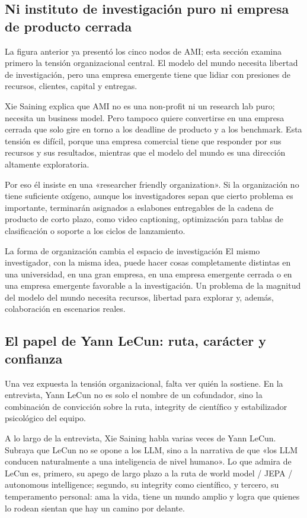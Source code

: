 \documentclass[a4paper]{article}
\begin{document}
\subsection{Ni instituto de investigación puro ni empresa de producto cerrada}

La figura anterior ya presentó los cinco nodos de AMI; esta sección examina primero la tensión organizacional central. El modelo del mundo necesita libertad de investigación, pero una empresa emergente tiene que lidiar con presiones de recursos, clientes, capital y entregas.

Xie Saining explica que AMI no es una non-profit ni un research lab puro; necesita un business model. Pero tampoco quiere convertirse en una empresa cerrada que solo gire en torno a los deadline de producto y a los benchmark. Esta tensión es difícil, porque una empresa comercial tiene que responder por sus recursos y sus resultados, mientras que el modelo del mundo es una dirección altamente exploratoria.

Por eso él insiste en una «researcher friendly organization». Si la organización no tiene suficiente oxígeno, aunque los investigadores sepan que cierto problema es importante, terminarán asignados a eslabones entregables de la cadena de producto de corto plazo, como video captioning, optimización para tablas de clasificación o soporte a los ciclos de lanzamiento.

\begin{importantbox}{La forma de organización cambia el espacio de investigación}
El mismo investigador, con la misma idea, puede hacer cosas completamente distintas en una universidad, en una gran empresa, en una empresa emergente cerrada o en una empresa emergente favorable a la investigación. Un problema de la magnitud del modelo del mundo necesita recursos, libertad para explorar y, además, colaboración en escenarios reales.
\end{importantbox}

\subsection{El papel de Yann LeCun: ruta, carácter y confianza}

Una vez expuesta la tensión organizacional, falta ver quién la sostiene. En la entrevista, Yann LeCun no es solo el nombre de un cofundador, sino la combinación de convicción sobre la ruta, integrity de científico y estabilizador psicológico del equipo.

A lo largo de la entrevista, Xie Saining habla varias veces de Yann LeCun. Subraya que LeCun no se opone a los LLM, sino a la narrativa de que «los LLM conducen naturalmente a una inteligencia de nivel humano». Lo que admira de LeCun es, primero, su apego de largo plazo a la ruta de world model / JEPA / autonomous intelligence; segundo, su integrity como científico, y tercero, su temperamento personal: ama la vida, tiene un mundo amplio y logra que quienes lo rodean sientan que hay un camino por delante.
\end{document}
